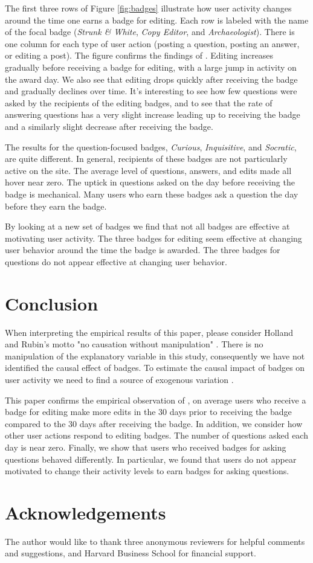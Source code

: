 \documentclass[conference]{IEEEtran}
\newcommand{\1}{\mathds{1}}
\begin{document}
The first three rows of Figure \ref{fig:badges} illustrate how user activity changes around the time one earns a badge for editing. Each row is labeled with the name of the focal badge (\textit{Strunk \& White}, \textit{Copy Editor}, and \textit{Archaeologist}). There is one column for each type of user action (posting a question, posting an answer, or editing a post). The figure confirms the findings of \citet{Grant2013}. Editing increases gradually before receiving a badge for editing, with a large jump in activity on the award day. We also see that editing drops quickly after receiving the badge and gradually declines over time. It's interesting to see how few questions were asked by the recipients of the editing badges, and to see that the rate of answering questions has a very slight increase leading up to receiving the badge and a similarly slight decrease after receiving the badge.

The results for the question-focused badges, \textit{Curious}, \textit{Inquisitive}, and \textit{Socratic}, are quite different. In general, recipients of these badges are not particularly active on the site. The average level of questions, answers, and edits made all hover near zero. The uptick in questions asked on the day before receiving the badge is mechanical. Many users who earn these badges ask a question the day before they earn the badge.

By looking at a new set of badges we find that not all badges are effective at motivating user activity. The three badges for editing seem effective at changing user behavior around the time the badge is awarded. The three badges for questions do not appear effective at changing user behavior.

\section{Conclusion}

When interpreting the empirical results of this paper, please consider Holland and Rubin's motto "no causation without manipulation" \citep{Holland1986}. There is no manipulation of the explanatory variable in this study, consequently we have not identified the causal effect of badges. To estimate the causal impact of badges on user activity we need to find a source of exogenous variation \citep{Miller2013}.

This paper confirms the empirical observation of \citet{Grant2013}, on average users who receive a badge for editing make more edits in the 30 days prior to receiving the badge compared to the 30 days after receiving the badge. In addition, we consider how other user actions respond to editing badges. The number of questions asked each day is near zero. Finally, we show that users who received badges for asking questions behaved differently. In particular, we found that users do not appear motivated to change their activity levels to earn badges for asking questions.

\section*{Acknowledgements}

The author would like to thank three anonymous reviewers for helpful comments and suggestions, and Harvard Business School for financial support.

\nocite{MSRChallenge2015}

\renewcommand{\bibfont}{\small}


\end{document}
